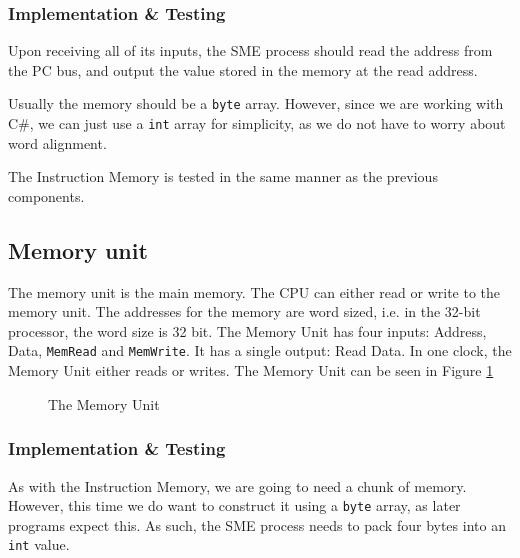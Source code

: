 \subsubsection*{Implementation \& Testing}
Upon receiving all of its inputs, the SME process should read the address from
the PC bus, and output the value stored in the memory at the read
address.

Usually the memory should be a \texttt{byte} array. However, since we are
working with C\#, we can just use a \texttt{int} array for simplicity, as we do
not have to worry about word alignment.

The Instruction Memory is tested in the same manner as the previous components.

\subsection{Memory unit}
The memory unit is the main memory. The CPU can either read or write to the
memory unit. The addresses for the memory are word sized, i.e. in the 32-bit
processor, the word size is 32 bit. The Memory Unit has four inputs: Address,
Data, \texttt{MemRead} and \texttt{MemWrite}. It has a single output: Read
Data. In one clock, the Memory Unit either reads or writes. The Memory Unit can
be seen in Figure \ref{fig:mem}
\begin{figure}
    \centering
    \caption{The Memory Unit}
    \label{fig:mem}
\end{figure}

\subsubsection*{Implementation \& Testing}
As with the Instruction Memory, we are going to need a chunk of memory.
However, this time we do want to construct it using a \texttt{byte} array, as
later programs expect this. As such, the SME process needs to pack four bytes
into an \texttt{int} value.

